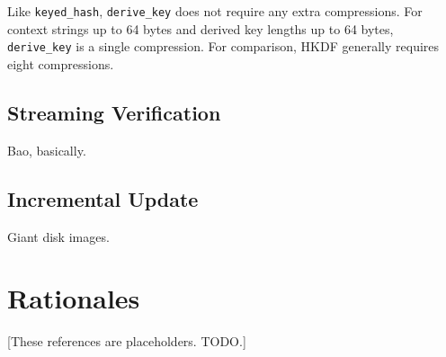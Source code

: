 \documentclass[11pt,notitlepage,a4paper]{article}
\begin{document}
Like \texttt{keyed\_hash}, \texttt{derive\_key} does not require any extra
compressions. For context strings up to 64 bytes and derived key lengths up to
64 bytes, \texttt{derive\_key} is a single compression. For comparison, HKDF
generally requires eight compressions.

\subsection{Streaming Verification}\label{sec:streamingverification}

Bao, basically.

\subsection{Incremental Update}\label{sec:incrementalupdate}

Giant disk images.

\section{Rationales}\label{sec:rationales}

\nocite{*}



[These references are placeholders. TODO.]
\end{document}

